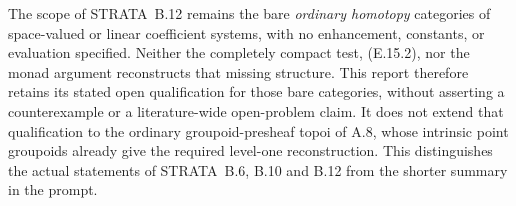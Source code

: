 The scope of STRATA~B.12 remains the bare \emph{ordinary homotopy}
categories of space-valued or linear coefficient systems, with no
enhancement, constants, or evaluation specified. Neither the
completely compact test, (E.15.2), nor the monad argument reconstructs
that missing structure. This report therefore retains its stated
open qualification for those bare categories, without asserting a
counterexample or a literature-wide open-problem claim. It does not
extend that qualification to the ordinary groupoid-presheaf topoi of
A.8, whose intrinsic point groupoids already give the required
level-one reconstruction. This distinguishes the actual statements
of STRATA~B.6, B.10 and B.12 from the shorter summary in the prompt.
